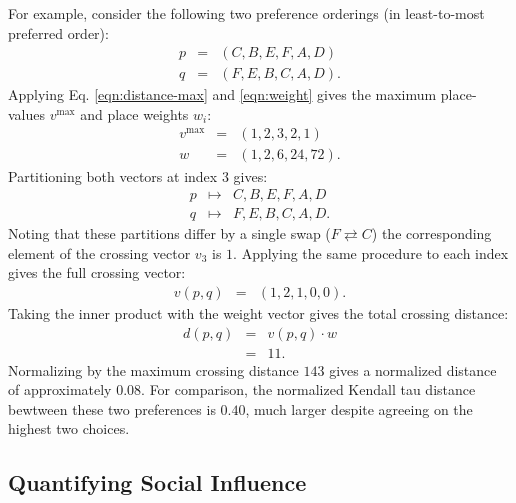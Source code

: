 For example, consider the following two preference orderings (in least-to-most preferred order):
\begin{eqnarray}
p &=& (C, B, E, F, A, D) \\
q &=& (F, E, B, C, A, D).
\end{eqnarray}
Applying Eq. \ref{eqn:distance-max} and \ref{eqn:weight} 
gives the maximum place-values $v^{\text{max}}$ and place weights $w_i$:
\begin{eqnarray}
v^{\text{max}} &=& (1, 2, 3, 2, 1) \\
w &=& (1, 2, 6, 24, 72).
\end{eqnarray}
Partitioning both vectors at index 3 gives:
\begin{eqnarray}
p &\mapsto& {C, B, E}, {F, A, D} \\
q &\mapsto& {F, E, B}, {C, A, D}.
\end{eqnarray}
Noting that these partitions differ by a single swap ($F \rightleftarrows C$)
the corresponding element of the crossing vector $v_3$ is $1$.
Applying the same procedure to each index gives the full crossing vector:
\begin{eqnarray}
v(p,q) &=& (1, 2, 1, 0, 0).
\end{eqnarray}
Taking the inner product with the weight vector gives the total crossing distance:
\begin{eqnarray}
d(p, q) &=& v(p,q) \cdot w \\
&=& 11.
\end{eqnarray}
Normalizing by the maximum crossing distance $143$ gives a normalized distance of approximately $0.08$.
For comparison, the normalized Kendall tau distance bewtween these two preferences is $0.40$,
much larger despite agreeing on the highest two choices.


\subsection{Quantifying Social Influence}

